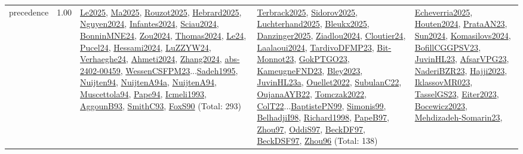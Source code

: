 {\begin{longtable}{p{3cm}r>{\raggedright\arraybackslash}p{6cm}>{\raggedright\arraybackslash}p{6cm}>{\raggedright\arraybackslash}p{8cm}}
\index{precedence}\index{Concepts!precedence}precedence &  1.00 & \hyperref[detail:Le2025]{Le2025}, \hyperref[detail:Ma2025]{Ma2025}, \hyperref[detail:Rouzot2025]{Rouzot2025}, \hyperref[detail:Hebrard2025]{Hebrard2025}, \hyperref[detail:Nguyen2024]{Nguyen2024}, \hyperref[detail:Infantes2024]{Infantes2024}, \hyperref[detail:Sciau2024]{Sciau2024}, \hyperref[detail:BonninMNE24]{BonninMNE24}, \hyperref[detail:Zou2024]{Zou2024}, \hyperref[detail:Thomas2024]{Thomas2024}, \hyperref[detail:Le24]{Le24}, \hyperref[detail:Pucel24]{Pucel24}, \hyperref[detail:Hessami2024]{Hessami2024}, \hyperref[detail:LuZZYW24]{LuZZYW24}, \hyperref[detail:Verhaeghe24]{Verhaeghe24}, \hyperref[detail:Ahmeti2024]{Ahmeti2024}, \hyperref[detail:Zhang2024]{Zhang2024}, \hyperref[detail:abs-2402-00459]{abs-2402-00459}, \hyperref[detail:WessenCSFPM23]{WessenCSFPM23}...\hyperref[detail:Sadeh1995]{Sadeh1995}, \hyperref[detail:Nuijten94]{Nuijten94}, \hyperref[detail:NuijtenA94a]{NuijtenA94a}, \hyperref[detail:NuijtenA94]{NuijtenA94}, \hyperref[detail:Muscettola94]{Muscettola94}, \hyperref[detail:Pape94]{Pape94}, \hyperref[detail:Icmeli1993]{Icmeli1993}, \hyperref[detail:AggounB93]{AggounB93}, \hyperref[detail:SmithC93]{SmithC93}, \hyperref[detail:FoxS90]{FoxS90} (Total: 293) & \hyperref[detail:Terbrack2025]{Terbrack2025}, \hyperref[detail:Sidorov2025]{Sidorov2025}, \hyperref[detail:Luchterhand2025]{Luchterhand2025}, \hyperref[detail:Bleukx2025]{Bleukx2025}, \hyperref[detail:Danzinger2025]{Danzinger2025}, \hyperref[detail:Ziadlou2024]{Ziadlou2024}, \hyperref[detail:Cloutier24]{Cloutier24}, \hyperref[detail:Laalaoui2024]{Laalaoui2024}, \hyperref[detail:TardivoDFMP23]{TardivoDFMP23}, \hyperref[detail:Bit-Monnot23]{Bit-Monnot23}, \hyperref[detail:GokPTGO23]{GokPTGO23}, \hyperref[detail:KameugneFND23]{KameugneFND23}, \hyperref[detail:Bley2023]{Bley2023}, \hyperref[detail:JuvinHL23a]{JuvinHL23a}, \hyperref[detail:Ouellet2022]{Ouellet2022}, \hyperref[detail:SubulanC22]{SubulanC22}, \hyperref[detail:OujanaAYB22]{OujanaAYB22}, \hyperref[detail:Tomczak2022]{Tomczak2022}, \hyperref[detail:ColT22]{ColT22}...\hyperref[detail:BaptistePN99]{BaptistePN99}, \hyperref[detail:Simonis99]{Simonis99}, \hyperref[detail:BelhadjiI98]{BelhadjiI98}, \hyperref[detail:Richard1998]{Richard1998}, \hyperref[detail:PapeB97]{PapeB97}, \hyperref[detail:Zhou97]{Zhou97}, \hyperref[detail:OddiS97]{OddiS97}, \hyperref[detail:BeckDF97]{BeckDF97}, \hyperref[detail:BeckDSF97]{BeckDSF97}, \hyperref[detail:Zhou96]{Zhou96} (Total: 138) & \hyperref[detail:Echeverria2025]{Echeverria2025}, \hyperref[detail:Houten2024]{Houten2024}, \hyperref[detail:PrataAN23]{PrataAN23}, \hyperref[detail:Sun2024]{Sun2024}, \hyperref[detail:Komasilovs2024]{Komasilovs2024}, \hyperref[detail:BofillCGGPSV23]{BofillCGGPSV23}, \hyperref[detail:JuvinHL23]{JuvinHL23}, \hyperref[detail:AfsarVPG23]{AfsarVPG23}, \hyperref[detail:NaderiBZR23]{NaderiBZR23}, \hyperref[detail:Hajji2023]{Hajji2023}, \hyperref[detail:IklassovMR023]{IklassovMR023}, \hyperref[detail:TasselGS23]{TasselGS23}, \hyperref[detail:Eiter2023]{Eiter2023}, \hyperref[detail:Bocewicz2023]{Bocewicz2023}, \hyperref[detail:Mehdizadeh-Somarin23]{Mehdizadeh-Somarin23}, 
\end{longtable}}
